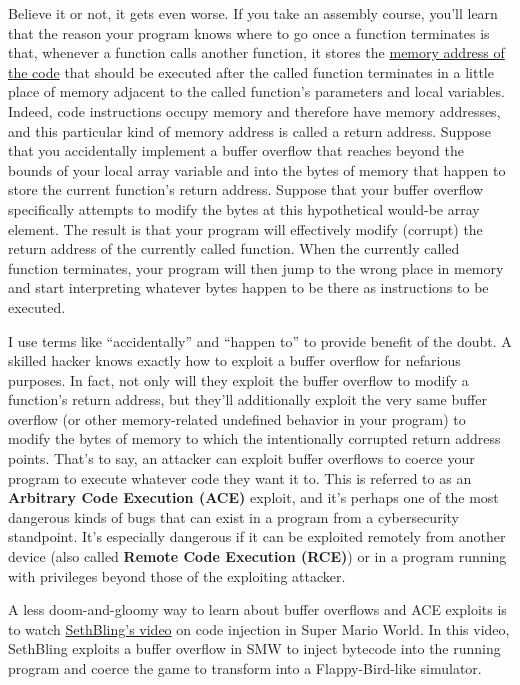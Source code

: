 \documentclass{article}
\begin{document}
Believe it or not, it gets even worse. If you take an assembly course, you'll learn that the reason your program knows where to go once a function terminates is that, whenever a function calls another function, it stores the \ul{memory address of the code} that should be executed after the called function terminates in a little place of memory adjacent to the called function's parameters and local variables. Indeed, code instructions occupy memory and therefore have memory addresses, and this particular kind of memory address is called a return address. Suppose that you accidentally implement a buffer overflow that reaches beyond the bounds of your local array variable and into the bytes of memory that happen to store the current function's return address. Suppose that your buffer overflow specifically attempts to modify the bytes at this hypothetical would-be array element. The result is that your program will effectively modify (corrupt) the return address of the currently called function. When the currently called function terminates, your program will then jump to the wrong place in memory and start interpreting whatever bytes happen to be there as instructions to be executed.

I use terms like ``accidentally'' and ``happen to'' to provide benefit of the doubt. A skilled hacker knows exactly how to exploit a buffer overflow for nefarious purposes. In fact, not only will they exploit the buffer overflow to modify a function's return address, but they'll additionally exploit the very same buffer overflow (or other memory-related undefined behavior in your program) to modify the bytes of memory to which the intentionally corrupted return address points. That's to say, an attacker can exploit buffer overflows to coerce your program to execute whatever code they want it to. This is referred to as an \textbf{Arbitrary Code Execution (ACE)} exploit, and it's perhaps one of the most dangerous kinds of bugs that can exist in a program from a cybersecurity standpoint. It's especially dangerous if it can be exploited remotely from another device (also called \textbf{Remote Code Execution (RCE)}) or in a program running with privileges beyond those of the exploiting attacker.

A less doom-and-gloomy way to learn about buffer overflows and ACE exploits is to watch \href{https://www.youtube.com/watch?v=hB6eY73sLV0&t=21s}{SethBling's video} on code injection in Super Mario World. In this video, SethBling exploits a buffer overflow in SMW to inject bytecode into the running program and coerce the game to transform into a Flappy-Bird-like simulator.
\end{document}
